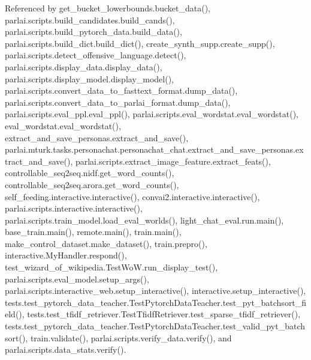 Referenced by get\+\_\+bucket\+\_\+lowerbounds.\+bucket\+\_\+data(), parlai.\+scripts.\+build\+\_\+candidates.\+build\+\_\+cands(), parlai.\+scripts.\+build\+\_\+pytorch\+\_\+data.\+build\+\_\+data(), parlai.\+scripts.\+build\+\_\+dict.\+build\+\_\+dict(), create\+\_\+synth\+\_\+supp.\+create\+\_\+supp(), parlai.\+scripts.\+detect\+\_\+offensive\+\_\+language.\+detect(), parlai.\+scripts.\+display\+\_\+data.\+display\+\_\+data(), parlai.\+scripts.\+display\+\_\+model.\+display\+\_\+model(), parlai.\+scripts.\+convert\+\_\+data\+\_\+to\+\_\+fasttext\+\_\+format.\+dump\+\_\+data(), parlai.\+scripts.\+convert\+\_\+data\+\_\+to\+\_\+parlai\+\_\+format.\+dump\+\_\+data(), parlai.\+scripts.\+eval\+\_\+ppl.\+eval\+\_\+ppl(), parlai.\+scripts.\+eval\+\_\+wordstat.\+eval\+\_\+wordstat(), eval\+\_\+wordstat.\+eval\+\_\+wordstat(), extract\+\_\+and\+\_\+save\+\_\+personas.\+extract\+\_\+and\+\_\+save(), parlai.\+mturk.\+tasks.\+personachat.\+personachat\+\_\+chat.\+extract\+\_\+and\+\_\+save\+\_\+personas.\+extract\+\_\+and\+\_\+save(), parlai.\+scripts.\+extract\+\_\+image\+\_\+feature.\+extract\+\_\+feats(), controllable\+\_\+seq2seq.\+nidf.\+get\+\_\+word\+\_\+counts(), controllable\+\_\+seq2seq.\+arora.\+get\+\_\+word\+\_\+counts(), self\+\_\+feeding.\+interactive.\+interactive(), convai2.\+interactive.\+interactive(), parlai.\+scripts.\+interactive.\+interactive(), parlai.\+scripts.\+train\+\_\+model.\+load\+\_\+eval\+\_\+worlds(), light\+\_\+chat\+\_\+eval.\+run.\+main(), base\+\_\+train.\+main(), remote.\+main(), train.\+main(), make\+\_\+control\+\_\+dataset.\+make\+\_\+dataset(), train.\+prepro(), interactive.\+My\+Handler.\+respond(), test\+\_\+wizard\+\_\+of\+\_\+wikipedia.\+Test\+Wo\+W.\+run\+\_\+display\+\_\+test(), parlai.\+scripts.\+eval\+\_\+model.\+setup\+\_\+args(), parlai.\+scripts.\+interactive\+\_\+web.\+setup\+\_\+interactive(), interactive.\+setup\+\_\+interactive(), tests.\+test\+\_\+pytorch\+\_\+data\+\_\+teacher.\+Test\+Pytorch\+Data\+Teacher.\+test\+\_\+pyt\+\_\+batchsort\+\_\+field(), tests.\+test\+\_\+tfidf\+\_\+retriever.\+Test\+Tfidf\+Retriever.\+test\+\_\+sparse\+\_\+tfidf\+\_\+retriever(), tests.\+test\+\_\+pytorch\+\_\+data\+\_\+teacher.\+Test\+Pytorch\+Data\+Teacher.\+test\+\_\+valid\+\_\+pyt\+\_\+batchsort(), train.\+validate(), parlai.\+scripts.\+verify\+\_\+data.\+verify(), and parlai.\+scripts.\+data\+\_\+stats.\+verify().


